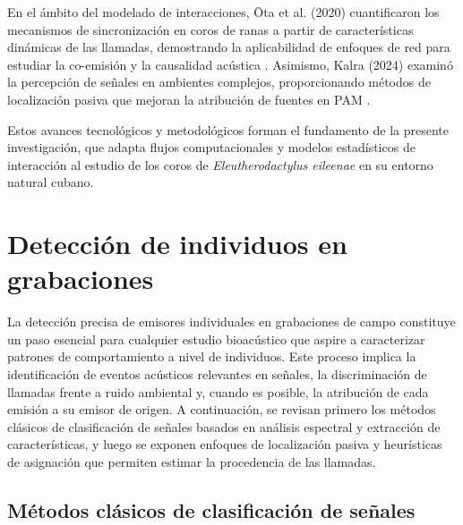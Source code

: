 En el ámbito del modelado de interacciones, Ōta et al. (2020) 
cuantificaron los mecanismos de sincronización en coros de 
ranas a partir de características dinámicas de las llamadas, 
demostrando la aplicabilidad de enfoques de red para estudiar 
la co-emisión y la causalidad acústica 
\cite{ota2020interaction}. Asimismo, Kalra (2024) examinó la 
percepción de señales en ambientes complejos, proporcionando 
métodos de localización pasiva que mejoran la atribución de 
fuentes en PAM \cite{kalra2024signal}.

Estos avances tecnológicos y metodológicos forman el 
fundamento de la presente investigación, que adapta flujos 
computacionales y modelos estadísticos de interacción al 
estudio de los coros de \emph{Eleutherodactylus eileenae} en 
su entorno natural cubano.



\section{Detección de individuos en grabaciones}
\label{sec:deteccion_individuos}



La detección precisa de emisores individuales en grabaciones 
de campo constituye un paso esencial para cualquier estudio 
bioacústico que aspire a caracterizar patrones de 
comportamiento a nivel de individuos. Este proceso implica la 
identificación de eventos acústicos relevantes en señales, 
la discriminación de llamadas frente a ruido ambiental y, 
cuando es posible, la atribución de cada emisión a su emisor 
de origen. A continuación, se revisan primero los métodos 
clásicos de clasificación de señales basados en análisis 
espectral y extracción de características, y luego se exponen 
enfoques de localización pasiva y heurísticas de asignación 
que permiten estimar la procedencia de las llamadas.

\subsection{Métodos clásicos de clasificación de señales}

